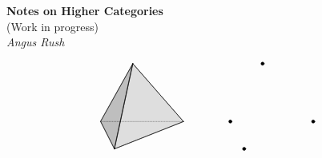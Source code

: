 \documentclass[a4paper,12pt]{scrbook}
\begin{document}
\begin{titlepage}
   \begin{center}
     \Huge\textbf{Notes on Higher Categories}\\
     \Large(Work in progress) \\
     \vspace*{1em}
     \Large\textit{Angus Rush}
   \end{center}
   \begin{equation*}
     \begin{aligned}
       \begin{tikzpicture}[line join = round, scale=1.5, line cap = round]
         \coordinate (3) at (0,{sqrt(2)},0);
         \coordinate (2) at ({-.5*sqrt(3)},0,-.5);
         \coordinate (1) at (0,0,1);
         \coordinate (0) at ({.5*sqrt(3)},0,-.5);

         \draw[densely dotted,] (0)--(2);
         \draw[fill=lightgray,fill opacity=.5] (1)--(0)--(3)--cycle;
         \draw[fill=gray,fill opacity=.5] (2)--(1)--(3)--cycle;
         \draw (1)--(0);
         \draw (1)--(2);
         \draw (2)--(3);
         \draw (1)--(3);
         \draw (0)--(3);
       \end{tikzpicture}
     \end{aligned}
     \qquad\qquad
     \begin{aligned}
       \begin{tikzpicture}[dot/.style={draw,circle,minimum size=1mm,inner sep=0pt,outer sep=0pt,fill=black}, line join = round, scale=1.5, line cap = round]

         \coordinate[draw, dot] (3) at (0,{sqrt(2)},0);
         \coordinate[draw, dot] (2) at ({.5*sqrt(3)},0,-.5);
         \coordinate[draw, dot] (1) at (0,0,1);
         \coordinate[draw, dot] (0) at ({-.5*sqrt(3)},0,-.5);


\end{tikzpicture}
\end{aligned}
\end{equation*}
\end{titlepage}
\end{document}
